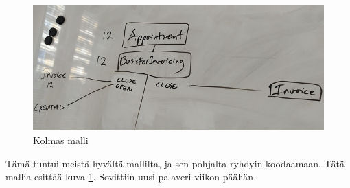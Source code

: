 \begin{figure}
\centering
\includegraphics[width=\textwidth,height=0.5\textheight]{illustration/malli3.jpg}
\caption{\label{malli3}Kolmas malli}
\end{figure}

Tämä tuntui meistä hyvältä mallilta, ja sen pohjalta ryhdyin koodaamaan.
Tätä mallia esittää kuva \ref{malli3}. Sovittiin uusi palaveri viikon
päähän.
